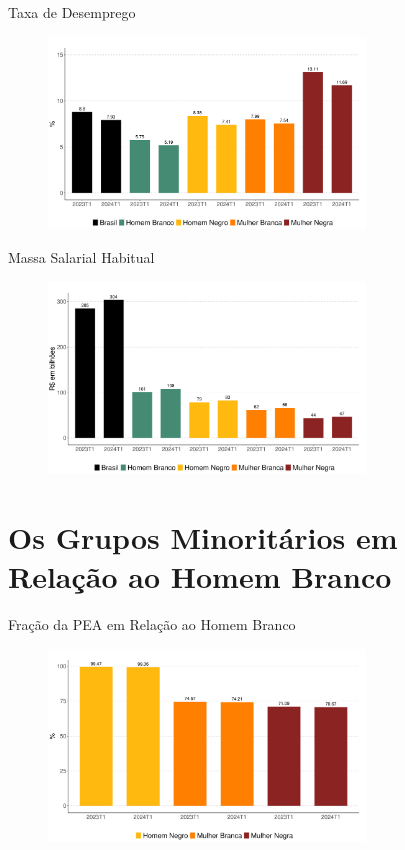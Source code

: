\documentclass[10pt, xcolor=x11names,compress]{beamer}
\begin{document}
	\begin{frame}{Taxa de Desemprego}
		\begin{figure}
			\centering
			\includegraphics[width = 0.75\textwidth]{../figures_output/unemp.pdf}
		\end{figure}
	\end{frame}	
	
	\begin{frame}{Massa Salarial Habitual}
		\begin{figure}
			\centering
			\includegraphics[width = 0.75\textwidth]{../figures_output/massa_habitual.pdf}
		\end{figure}
	\end{frame}
	
	
	\section{Os Grupos Minoritários em Relação ao Homem Branco} 
	\begin{frame}{Fração da PEA em Relação ao Homem Branco}
		\begin{figure}
			\centering
			\includegraphics[width = 0.75\textwidth]{../figures_output/frac_pea.pdf}
		\end{figure}
	\end{frame}
	
\end{document}
